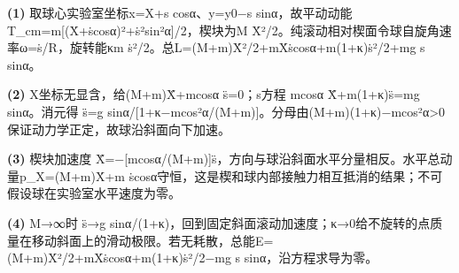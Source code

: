 \par\noindent\textbf{(1)} 取球心实验室坐标x=X+s cosα、y=y0−s sinα，故平动动能T\_cm=m[(Ẋ+ṡcosα)²+ṡ²sin²α]/2，楔块为M Ẋ²/2。纯滚动相对楔面令球自旋角速率ω=ṡ/R，旋转能κm ṡ²/2。总L=(M+m)Ẋ²/2+mẊṡcosα+m(1+κ)ṡ²/2+mg s sinα。
\par\noindent\textbf{(2)} X坐标无显含，给(M+m)Ẍ+mcosα s̈=0；s方程 mcosα Ẍ+m(1+κ)s̈=mg sinα。消元得 s̈=g sinα/[1+κ−mcos²α/(M+m)]。分母由(M+m)(1+κ)−mcos²α>0保证动力学正定，故球沿斜面向下加速。
\par\noindent\textbf{(3)} 楔块加速度 Ẍ=−[mcosα/(M+m)]s̈，方向与球沿斜面水平分量相反。水平总动量p\_X=(M+m)Ẋ+m ṡcosα守恒，这是楔和球内部接触力相互抵消的结果；不可假设球在实验室水平速度为零。
\par\noindent\textbf{(4)} M→∞时 s̈→g sinα/(1+κ)，回到固定斜面滚动加速度；κ→0给不旋转的点质量在移动斜面上的滑动极限。若无耗散，总能E=(M+m)Ẋ²/2+mẊṡcosα+m(1+κ)ṡ²/2−mg s sinα，沿方程求导为零。
